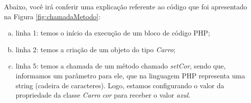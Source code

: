 \FloatBarrier 	%

Abaixo, você irá conferir uma explicação referente ao código que foi
apresentado na Figura \ref{fig:chamadaMetodo}:

\begin{enumerate}[a)]
    \item linha 1: temos o início da execução de um bloco de código
    PHP;
    \item linha 2: temos a criação de um objeto do tipo \textit{Carro};
    \item linha 5: temos a chamada de um método chamado
    \textit{setCor}, sendo que, informamos um parâmetro para ele, que na
    linguagem PHP representa uma string (cadeira de caracteres). Logo, estamos
    configurando o valor da propriedade da classe \textit{Carro} \textit{cor}
    para receber o valor \textit{azul}.
\end{enumerate}